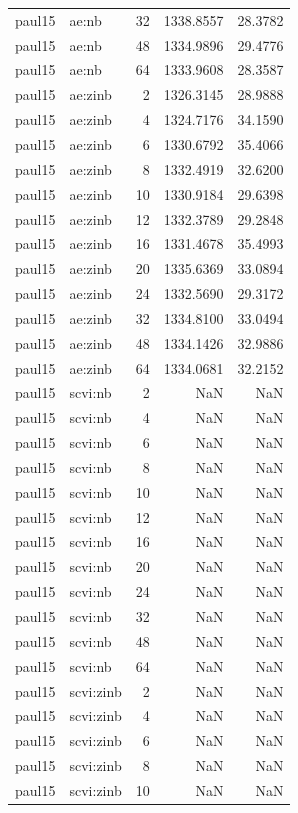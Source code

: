 \begin{tabular}{llrrr}
paul15 & ae:nb & 32 & 1338.8557 & 28.3782 \\
paul15 & ae:nb & 48 & 1334.9896 & 29.4776 \\
paul15 & ae:nb & 64 & 1333.9608 & 28.3587 \\
paul15 & ae:zinb & 2 & 1326.3145 & 28.9888 \\
paul15 & ae:zinb & 4 & 1324.7176 & 34.1590 \\
paul15 & ae:zinb & 6 & 1330.6792 & 35.4066 \\
paul15 & ae:zinb & 8 & 1332.4919 & 32.6200 \\
paul15 & ae:zinb & 10 & 1330.9184 & 29.6398 \\
paul15 & ae:zinb & 12 & 1332.3789 & 29.2848 \\
paul15 & ae:zinb & 16 & 1331.4678 & 35.4993 \\
paul15 & ae:zinb & 20 & 1335.6369 & 33.0894 \\
paul15 & ae:zinb & 24 & 1332.5690 & 29.3172 \\
paul15 & ae:zinb & 32 & 1334.8100 & 33.0494 \\
paul15 & ae:zinb & 48 & 1334.1426 & 32.9886 \\
paul15 & ae:zinb & 64 & 1334.0681 & 32.2152 \\
paul15 & scvi:nb & 2 & NaN & NaN \\
paul15 & scvi:nb & 4 & NaN & NaN \\
paul15 & scvi:nb & 6 & NaN & NaN \\
paul15 & scvi:nb & 8 & NaN & NaN \\
paul15 & scvi:nb & 10 & NaN & NaN \\
paul15 & scvi:nb & 12 & NaN & NaN \\
paul15 & scvi:nb & 16 & NaN & NaN \\
paul15 & scvi:nb & 20 & NaN & NaN \\
paul15 & scvi:nb & 24 & NaN & NaN \\
paul15 & scvi:nb & 32 & NaN & NaN \\
paul15 & scvi:nb & 48 & NaN & NaN \\
paul15 & scvi:nb & 64 & NaN & NaN \\
paul15 & scvi:zinb & 2 & NaN & NaN \\
paul15 & scvi:zinb & 4 & NaN & NaN \\
paul15 & scvi:zinb & 6 & NaN & NaN \\
paul15 & scvi:zinb & 8 & NaN & NaN \\
paul15 & scvi:zinb & 10 & NaN & NaN \\

\end{tabular}
